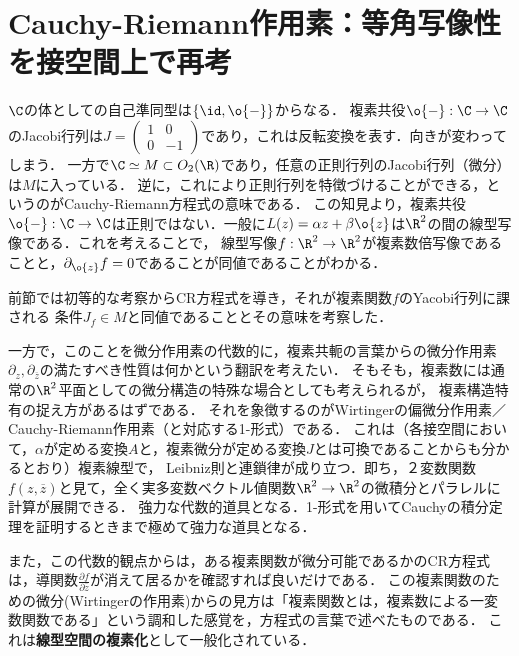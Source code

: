 \documentclass[uplatex, dvipdfmx]{jsreport}
\begin{document}
\section{Cauchy-Riemann作用素：等角写像性を接空間上で再考}

\begin{tcolorbox}[colframe=ForestGreen, colback=ForestGreen!10!white,breakable,colbacktitle=ForestGreen!40!white,coltitle=black,fonttitle=\bfseries\sffamily,
title=見直し予定5/24/2021]
    $\C$の体としての自己準同型は$\{\id,\o{-}\}$からなる．
    複素共役$\o{-}:\C\to\C$のJacobi行列は$J=\begin{pmatrix}1&0\\0&-1\end{pmatrix}$であり，これは反転変換を表す．向きが変わってしまう．
    一方で$\C\simeq M\subset O_2(\R)$であり，任意の正則行列のJacobi行列（微分）は$M$に入っている．
    逆に，これにより正則行列を特徴づけることができる，というのがCauchy-Riemann方程式の意味である．
    この知見より，複素共役$\o{-}:\C\to\C$は正則ではない．一般に$L(z)=\alpha z+\beta\o{z}$は$\R^2$の間の線型写像である．これを考えることで，
    線型写像$f:\R^2\to\R^2$が複素数倍写像であることと，$\partial_{\o{z}}f=0$であることが同値であることがわかる．
\end{tcolorbox}

\begin{screen}
    前節では初等的な考察からCR方程式を導き，それが複素関数$f$のYacobi行列に課される
    条件$J_f\in M$と同値であることとその意味を考察した．

    一方で，このことを微分作用素の代数的に，複素共軛の言葉からの微分作用素$\partial_z,\partial_{\overline{z}}$の満たすべき性質は何かという翻訳を考えたい．
    そもそも，複素数には通常の$\R^2$平面としての微分構造の特殊な場合としても考えられるが，
    複素構造特有の捉え方があるはずである．
    それを象徴するのがWirtingerの偏微分作用素／Cauchy-Riemann作用素（と対応する1-形式）である．
    これは（各接空間において，$\alpha$が定める変換$A$と，複素微分が定める変換$J$とは可換であることからも分かるとおり）複素線型で，
    Leibniz則と連鎖律が成り立つ．即ち，２変数関数$f(z,\overline{z})$と見て，全く実多変数ベクトル値関数$\R^2\to\R^2$の微積分とパラレルに計算が展開できる．
    強力な代数的道具となる．1-形式を用いてCauchyの積分定理を証明するときまで極めて強力な道具となる．

    また，この代数的観点からは，ある複素関数が微分可能であるかのCR方程式は，導関数$\frac{\partial f}{\partial\overline{z}}$が消えて居るかを確認すれば良いだけである．
    この複素関数のための微分(Wirtingerの作用素)からの見方は「複素関数とは，複素数による一変数関数である」という調和した感覚を，方程式の言葉で述べたものである．
    これは\textbf{線型空間の複素化}として一般化されている．
\end{screen}
\end{document}
